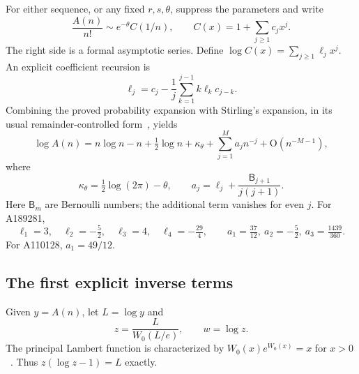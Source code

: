\documentclass[11pt]{article}
\numberwithin{equation}{section}
\theoremstyle{definition}
\theoremstyle{remark}
\theoremstyle{definition}
\newcommand{\bigO}{\mathrm O}
\begin{document}
For either sequence, or any fixed $r,s,\theta$, suppress the parameters and
write
\begin{equation}
 \frac{A(n)}{n!}\sim e^{-\theta}C(1/n),\qquad
 C(x)=1+\sum_{j\ge1}c_jx^j.
\end{equation}
The right side is a formal asymptotic series. Define
$\log C(x)=\sum_{j\ge1}\ell_jx^j$. An explicit coefficient recursion is
\begin{equation}
 \ell_j=c_j-\frac1j\sum_{k=1}^{j-1}k\ell_k c_{j-k}.
 \label{spf:eq:log-recursion}
\end{equation}
Combining the proved probability expansion with Stirling's expansion, in its
usual remainder-controlled form~\cite{dlmfGamma}, yields
\begin{equation}
 \log A(n)
 =n\log n-n+\tfrac12\log n+\kappa_\theta
       +\sum_{j=1}^{M}a_jn^{-j}+\bigO(n^{-M-1}),
 \label{spf:eq:logA}
\end{equation}
where
\begin{equation}
 \kappa_\theta=\tfrac12\log(2\pi)-\theta,\qquad
 a_j=\ell_j+\frac{\mathsf B_{j+1}}{j(j+1)}.
 \label{spf:eq:a-coeff}
\end{equation}
Here $\mathsf B_m$ are Bernoulli numbers; the additional term vanishes for
even $j$. For A189281,
\begin{equation}
 \ell_1=3,\quad\ell_2=-\tfrac52,\quad\ell_3=4,\quad\ell_4=-\tfrac{29}{4},
 \qquad a_1=\tfrac{37}{12},\ a_2=-\tfrac52,\ a_3=\tfrac{1439}{360}.
\end{equation}
For A110128, $a_1=49/12$.

\subsection{The first explicit inverse terms}

Given $y=A(n)$, let $L=\log y$ and
\begin{equation}
 z=\frac{L}{W_0(L/e)},\qquad w=\log z.
 \label{spf:eq:Lambert}
\end{equation}
The principal Lambert function is characterized by $W_0(x)e^{W_0(x)}=x$
for $x>0$~\cite{dlmfW}. Thus $z(\log z-1)=L$ exactly.
\end{document}
